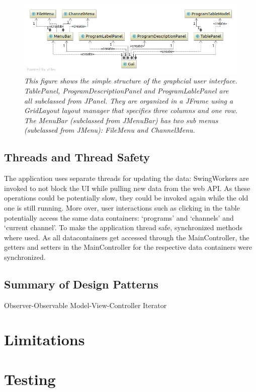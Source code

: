 \documentclass[a4paper,11pt,twoside]{article}
\begin{document}
\begin{figure}[p]
  \centering
  \includegraphics[width=1\textwidth]{guiUML.png}
  \caption{\textit{This figure shows the simple structure of the graphcial user interface. TablePanel, ProgramDescriptionPanel and ProgramLablePanel are all subclassed from JPanel. They are organized in a JFrame using a \textit{GridLayout} layout manager that specifies three columns and one row. The MenuBar (subclassed from JMenuBar) has two sub menus (subclassed from JMenu): FileMenu and ChannelMenu.}}
  \label{fig:gui}
\end{figure}



\subsection{Threads and Thread Safety}
The application uses separate threads for updating the data: SwingWorkers are invoked to not block the UI while pulling new data from the web API. As these operations could be potentially slow, they could be invoked again while the old one is still running. More over, user interactions such as clicking in the table potentially access the same data containers: `programs' and `channels' and `current channel'.
To make the application thread safe, synchronized methods where used. As all datacontainers get accessed through the MainController, the getters and setters in the MainController for the respective data containers were synchronized. 


\subsection{Summary of Design Patterns}
Observer-Observable
Model-View-Controller
Iterator


\section{Limitations}

\section{Testing}



\end{document}
